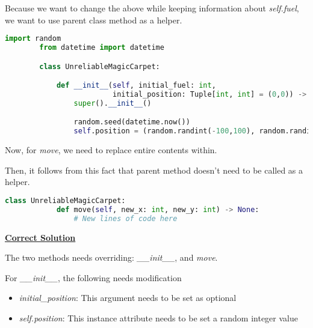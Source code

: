 \documentclass[12pt]{article}
\begin{document}
\begin{itemize}
\begin{enumerate}[a.]
        \bigskip

        Because we want to change the above while keeping information about \textit{self.fuel},
        we want to use parent class method as a helper.

        \bigskip

        \begin{lstlisting}[language=Python]
        import random
        from datetime import datetime

        class UnreliableMagicCarpet:

            def __init__(self, initial_fuel: int,
                         initial_position: Tuple[int, int] = (0,0)) -> None:
                super().__init__()

                random.seed(datetime.now())
                self.position = (random.randint(-100,100), random.randint(-100,100))

        \end{lstlisting}

        Now, for \textit{move}, we need to replace entire contents within.

        \bigskip

        Then, it follows from this fact that parent method doesn't need to be
        called as a helper.

        \bigskip

        \begin{lstlisting}[language=Python]
        class UnreliableMagicCarpet:
            def move(self, new_x: int, new_y: int) -> None:
                # New lines of code here

        \end{lstlisting}

        \begin{mdframed}
            \underline{\textbf{Correct Solution}}

            \bigskip

            The two methods needs overriding: \textit{\_\_init\_\_}, and \textit{move}.

            \bigskip

            For \textit{\_\_init\_\_}, the following needs modification

            \begin{itemize}
                \item \textit{initial\_position}: This argument needs to be set as optional
                \item \textit{self.position}: This instance attribute needs to be set a random integer value
            \end{itemize}


\end{mdframed}
\end{enumerate}
\end{itemize}
\end{document}
